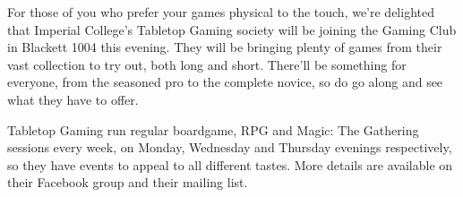 For those of you who prefer your games physical to the touch, we're delighted that Imperial College's Tabletop Gaming society will be joining the Gaming Club in Blackett 1004 this evening. They will be bringing plenty of games from their vast collection to try out, both long and short. There'll be something for everyone, from the seasoned pro to the complete novice, so do go along and see what they have to offer.

Tabletop Gaming run regular boardgame, RPG and Magic: The Gathering sessions every week, on Monday, Wednesday and Thursday evenings respectively, so they have events to appeal to all different tastes. More details are available on their Facebook group and their mailing list.